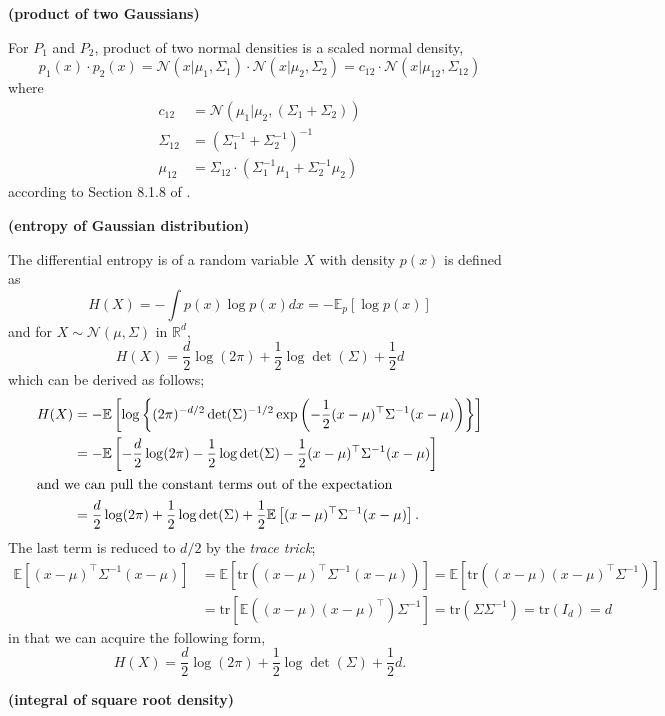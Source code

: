 \documentclass[11pt]{article}
\newcommand{\calN}{\mathcal{N}}
\newcommand{\bbR}{\mathbb{R}}
\newcommand{\bbE}{\mathbb{E}}
\newcommand{\tr}{\textrm{tr}}
\begin{document}
\begin{Facts}
	\item \textbf{(product of two Gaussians)}\label{fact:gaussian_product}
	
		For $P_1$ and $P_2$, product of two normal densities is a scaled normal density,
	\begin{equation*}
	p_1 (x) \cdot p_2 (x) = \calN(x\vert \mu_1, \Sigma_1) \cdot \calN(x\vert \mu_2, \Sigma_2) = c_{12}\cdot \calN(x\vert \mu_{12}, \Sigma_{12})
	\end{equation*} where
	\begin{align*}
	c_{12} &= \calN(\mu_1 \vert \mu_2, (\Sigma_1+\Sigma_2)) \\
	\Sigma_{12} &= (\Sigma_1^{-1} + \Sigma_2^{-1})^{-1} \\
	\mu_{12} &= \Sigma_{12} \cdot (\Sigma_1^{-1}\mu_1 + \Sigma_2^{-1} \mu_2) 
	\end{align*}
	according to Section 8.1.8 of \cite{petersen_matrix_2012}.
	\item \textbf{(entropy of Gaussian distribution)}\label{fact:gaussian_entropy}
	
	The differential entropy is of a random variable $X$ with density $p(x)$ is defined as 
	\begin{equation*}
	H(X) = -\int p(x) \log p(x) dx = -\bbE_p [\log p(x)]
	\end{equation*}
	and for $X \sim \calN(\mu, \Sigma)$ in $\bbR^d$, 
	\begin{equation*}
	H(X) = \frac{d}{2}\log(2\pi) + \frac{1}{2}\log \det(\Sigma) + \frac{1}{2}d
	\end{equation*}
	which can be derived as follows;
	\begin{align*}
	H(X) &= -\bbE\left[ \log \left\lbrace (2\pi)^{-d/2} \det(\Sigma)^{-1/2} \exp \left( -\frac{1}{2}(x-\mu)^\top \Sigma^{-1} (x-\mu) \right)  \right\rbrace \right] \\
	&= -\bbE \left[
	-\frac{d}{2}\log (2\pi) - \frac{1}{2}\log\det(\Sigma) - \frac{1}{2}(x-\mu)^\top \Sigma^{-1} (x-\mu)
	\right]\\
	\intertext{and we can pull the constant terms out of the expectation}
	&=\frac{d}{2}\log (2\pi) + \frac{1}{2}\log\det(\Sigma) + \frac{1}{2}\bbE\left[(x-\mu)^\top \Sigma^{-1} (x-\mu)\right].
	\end{align*}
	The last term is reduced to $d/2$ by the \textit{trace trick};
	\begin{align*}
	\bbE\left[(x-\mu)^\top \Sigma^{-1} (x-\mu)\right] &= \bbE\left[ \tr \left( (x-\mu)^\top \Sigma^{-1} (x-\mu) \right) \right] = \bbE\left[ \tr \left( (x-\mu)(x-\mu)^\top \Sigma^{-1}  \right) \right] \\
	&= \tr \left[ \bbE \left((x-\mu)(x-\mu)^\top\right) \Sigma^{-1}\right] = \tr \left( \Sigma \Sigma^{-1} \right) = \tr (I_d) = d
	\end{align*}
	in that we can acquire the following form,
	\begin{equation*}
	H(X) =  \frac{d}{2}\log (2\pi) + \frac{1}{2}\log\det(\Sigma) + \frac{1}{2}d.
	\end{equation*}
	\item \textbf{(integral of square root density)}\label{fact:gaussian_sqintegral}
	

\end{Facts}
\end{document}
